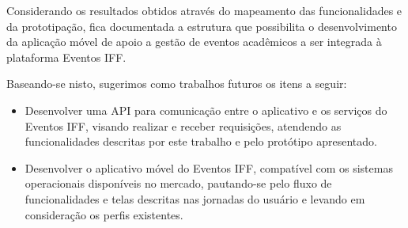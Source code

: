 Considerando os resultados obtidos através do mapeamento das funcionalidades e da prototipação, fica documentada a estrutura que possibilita o desenvolvimento da aplicação móvel de apoio a gestão de eventos acadêmicos a ser integrada à plataforma Eventos IFF.

Baseando-se nisto, sugerimos como trabalhos futuros os itens a seguir:

\begin{itemize}
    \item Desenvolver uma API para comunicação entre o aplicativo e os serviços do Eventos IFF, visando realizar e receber requisições, atendendo as funcionalidades descritas por este trabalho e pelo protótipo apresentado.
    
    \item Desenvolver o aplicativo móvel do Eventos IFF, compatível com os sistemas operacionais disponíveis no mercado, pautando-se pelo fluxo de funcionalidades e telas descritas nas jornadas do usuário e levando em consideração os perfis existentes.
\end{itemize}